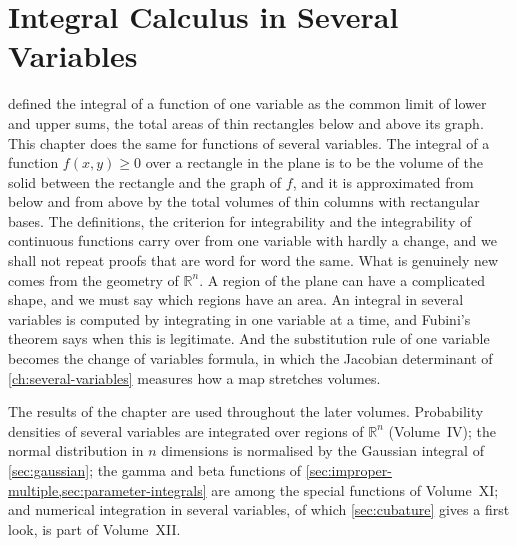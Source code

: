 \chapter{Integral Calculus in Several Variables}
\label{ch:multiple-integrals}


 defined the integral of a function of one variable as the common limit of lower and upper sums, the total areas of thin rectangles below and above its graph. This chapter does the same for functions of several variables. The integral of a function $f(x,y)\ge0$ over a rectangle in the plane is to be the volume of the solid between the rectangle and the graph of $f$, and it is approximated from below and from above by the total volumes of thin columns with rectangular bases. The definitions, the criterion for integrability and the integrability of continuous functions carry over from one variable with hardly a change, and we shall not repeat proofs that are word for word the same. What is genuinely new comes from the geometry of $\mathbb R^n$. A region of the plane can have a complicated shape, and we must say which regions have an area. An integral in several variables is computed by integrating in one variable at a time, and Fubini's theorem says when this is legitimate. And the substitution rule of one variable becomes the change of variables formula, in which the Jacobian determinant of \cref{ch:several-variables} measures how a map stretches volumes.

The results of the chapter are used throughout the later volumes. Probability densities of several variables are integrated over regions of $\mathbb R^n$ (Volume~IV); the normal distribution in $n$ dimensions is normalised by the Gaussian integral of \cref{sec:gaussian}; the gamma and beta functions of \cref{sec:improper-multiple,sec:parameter-integrals} are among the special functions of Volume~XI; and numerical integration in several variables, of which \cref{sec:cubature} gives a first look, is part of Volume~XII.


